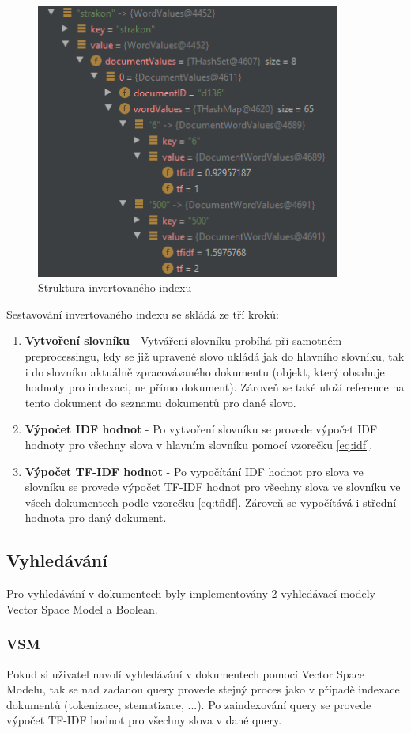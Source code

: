 \documentclass[12pt, a4paper]{article}
\begin{document}
\begin{figure}[h]
	\centering
	\includegraphics[width=10cm]{img/index.png}
	\caption{Struktura invertovaného indexu}
	\label{fig:index}
\end{figure}

Sestavování invertovaného indexu se skládá ze tří kroků:
\begin{enumerate}
\item \textbf{Vytvoření slovníku} - Vytváření slovníku probíhá při samotném preprocessingu, kdy se již upravené slovo ukládá jak do hlavního slovníku, tak i do slovníku aktuálně zpracovávaného dokumentu (objekt, který obsahuje hodnoty pro indexaci, ne přímo dokument). Zároveň se také uloží reference na tento dokument do seznamu dokumentů pro dané slovo.
\item \textbf{Výpočet IDF hodnot} - Po vytvoření slovníku se provede výpočet IDF hodnoty pro všechny slova v hlavním slovníku pomocí vzorečku \ref{eq:idf}.
\item \textbf{Výpočet TF-IDF hodnot} - Po vypočítání IDF hodnot pro slova ve slovníku se provede výpočet TF-IDF hodnot pro všechny slova ve slovníku ve všech dokumentech podle vzorečku \ref{eq:tfidf}. Zároveň se vypočítává i střední hodnota pro daný dokument.
\end{enumerate}

\subsection{Vyhledávání}
Pro vyhledávání v dokumentech byly implementovány 2 vyhledávací modely - Vector Space Model a Boolean.
\subsubsection{VSM}
Pokud si uživatel navolí vyhledávání v dokumentech pomocí Vector Space Modelu, tak se nad zadanou query provede stejný proces jako v případě indexace dokumentů (tokenizace, stematizace, ...). Po zaindexování query se provede výpočet TF-IDF hodnot pro všechny slova v dané query. 
\end{document}
